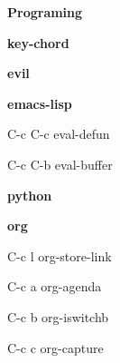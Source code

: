 \documentclass[10pt]{article}
\renewcommand\section[1]{\bigskip\par\textbf{\color{heading}\large#1}\smallskip}
\renewcommand\subsection[1]{\smallskip\par\textbf{\color{heading}#1}}
\begin{document}
\begin{multicols}{4}


  \section{Programing}
  \subsection{key-chord}
  \begin{keylist}
  \end{keylist}

  \subsection{evil}
  \begin{keylist}
  \end{keylist}

  \subsection{emacs-lisp}
  \begin{keylist}
  \item[C-c C-c] eval-defun
  \item[C-c C-b] eval-buffer
  \end{keylist}


  \subsection{python}
  \begin{keylist}
  \end{keylist}

  \subsection{org}
  \begin{keylist}
  \item[C-c l] org-store-link
  \item[C-c a] org-agenda
  \item[C-c b] org-iswitchb
  \item[C-c c] org-capture
  \end{keylist}

\end{multicols}
\end{document}
